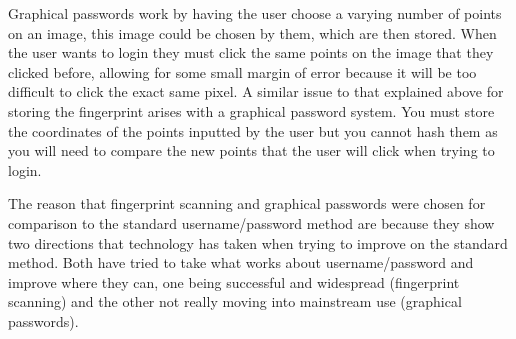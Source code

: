 \documentclass{ueacmpstyle}
\begin{document}
    Graphical passwords work by having the user choose a varying number of points on an image, 
    this image could be chosen by them, which are then stored. When the user wants to login 
    they must click the same points on the image that they clicked before, allowing for some 
    small margin of error because it will be too difficult to click the exact same pixel. 
    A similar issue to that explained above for storing the fingerprint arises with a 
    graphical password system. You must store the coordinates of the points inputted by the 
    user but you cannot hash them as you will need to compare the new points that the user 
    will click when trying to login.

    The reason that fingerprint scanning and graphical passwords were chosen for comparison 
    to the standard username/password method are because they show two directions that 
    technology has taken when trying to improve on the standard method. Both have tried to 
    take what works about username/password and improve where they can, one being successful 
    and widespread (fingerprint scanning) and the other not really moving into mainstream use 
    (graphical passwords).
\end{document}
